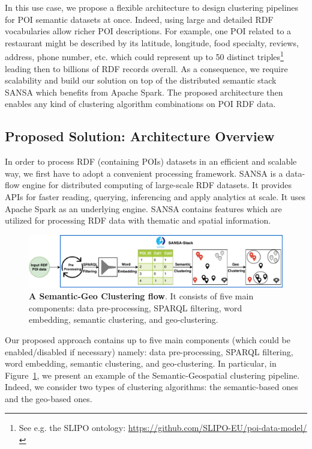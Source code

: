 In this use case, we propose a flexible architecture to design clustering pipelines for \gls{POI} semantic datasets at once.
Indeed, using large and detailed \gls{RDF} vocabularies allow richer \gls{POI} descriptions.
For example, one \gls{POI} related to a restaurant might be described by its latitude, longitude, food specialty, reviews, address, phone number, etc. which could represent up to 50 distinct triples\footnote{\scriptsize See e.g. the SLIPO ontology: \url{https://github.com/SLIPO-EU/poi-data-model/}} leading then to billions of \gls{RDF} records overall.
As a consequence, we require scalability and build our solution on top of the distributed semantic stack SANSA which benefits from Apache Spark.
The proposed architecture then enables any kind of clustering algorithm combinations on \gls{POI} \gls{RDF} data.

\subsection{Proposed Solution: Architecture Overview}
In order to process \gls{RDF} (containing \gls{POI}s) datasets in an efficient and scalable way, we first have to adopt a convenient processing framework.
SANSA is a data-flow engine for distributed computing of large-scale \gls{RDF} datasets. 
It provides \gls{API}s for faster reading, querying, inferencing and apply analytics at scale.
It uses Apache Spark as an underlying engine.
SANSA contains features which are utilized for processing \gls{RDF} data with thematic and spatial information.

\begin{figure}
    \centering
	\includegraphics[width=\textwidth]{images/7_implemenation_and_usecases/KmeansPaper8.pdf}
	\caption{\textbf{A Semantic-Geo Clustering flow}.
	It consists of five main components: data pre-processing, SPARQL filtering, word embedding, semantic clustering, and geo-clustering.}
	\label{fig:imp-use-case-clustering}
\end{figure}

Our proposed approach contains up to five main components (which could be enabled/disabled if necessary) namely: data pre-processing, \gls{SPARQL} filtering, word embedding, semantic clustering, and geo-clustering.
In particular, in Figure~\ref{fig:imp-use-case-clustering}, we present an example of the Semantic-Geospatial clustering pipeline.
Indeed, we consider two types of clustering algorithms: the semantic-based ones and the geo-based ones.

